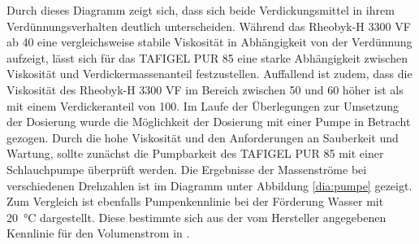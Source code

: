 \FloatBarrier 
Durch dieses Diagramm zeigt sich, dass sich beide Verdickungsmittel in ihrem Verdünnungsverhalten deutlich unterscheiden. Während das Rheobyk-H 3300 VF ab \SI{40}{\mpercent} eine vergleichsweise stabile Viskosität in Abhängigkeit von der Verdünnung aufzeigt, lässt sich für das TAFIGEL PUR 85 eine starke Abhängigkeit zwischen Viskosität und Verdickermassenanteil festzustellen. Auffallend ist zudem, dass die Viskosität des Rheobyk-H 3300 VF im Bereich zwischen 50 und \SI{60}{\mpercent} höher ist als mit einem Verdickeranteil von \SI{100}{\mpercent}.
%
%
%
Im Laufe der Überlegungen zur Umsetzung der Dosierung wurde die Möglichkeit der Dosierung mit einer Pumpe in Betracht gezogen. Durch die hohe Viskosität und den Anforderungen an Sauberkeit und Wartung, sollte zunächst die Pumpbarkeit des TAFIGEL PUR 85 mit einer Schlauchpumpe überprüft werden. Die Ergebnisse der Massenströme bei verschiedenen Drehzahlen ist im Diagramm unter Abbildung \ref{dia:pumpe} gezeigt. Zum Vergleich ist ebenfalls Pumpenkennlinie bei der Förderung Wasser mit \SI{20}{\celsius} dargestellt. Diese bestimmte sich aus der vom Hersteller angegebenen Kennlinie für den Volumenstrom in \cite{PonndorfGeratetechnikGmbH.2020}.

